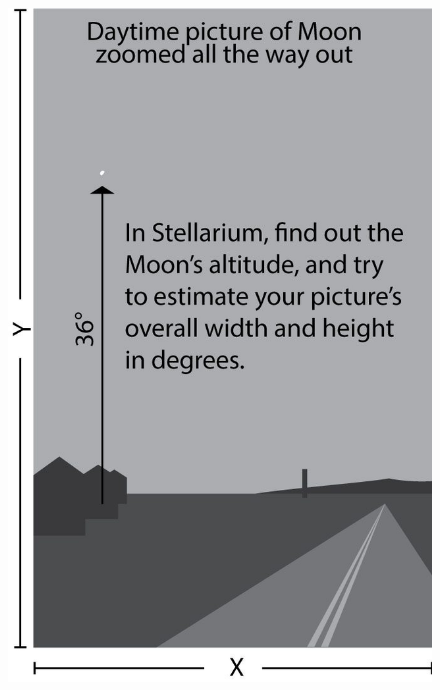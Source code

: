 \documentclass[main.tex]{subfiles}
\begin{document}
\begin{figure}[htbp]
\begin{center}
	\begin{minipage}{0.3\textwidth}
	\centering
	\includegraphics[width=\textwidth]{moonproj_zoomout.jpg}
	\end{minipage}
	\begin{minipage}{0.3\textwidth}
	\centering

\end{minipage}
\end{center}
\end{figure}
\end{document}
